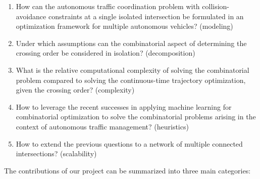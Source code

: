 \documentclass[a4paper]{report}
\theoremstyle{definition}
\theoremstyle{plain}
\begin{document}
\begin{enumerate}[label=RQ\arabic*:, leftmargin=3em, rightmargin=4em]
  \item How can the autonomous traffic coordination problem with
        collision-avoidance constraints at a single isolated intersection be
        formulated in an optimization framework for multiple autonomous
        vehicles? (modeling)

  \item Under which assumptions can the combinatorial aspect of determining the
        crossing order be considered in isolation? (decomposition)

  \item What is the relative computational complexity of solving the
        combinatorial problem compared to solving the continuous-time trajectory
        optimization, given the crossing order? (complexity)

  \item How to leverage the recent successes in applying machine learning for
        combinatorial optimization to solve the combinatorial problems arising
        in the context of autonomous traffic management? (heuristics)

  \item How to extend the previous questions to a network of multiple connected
        intersections? (scalability)
\end{enumerate}



\noindent
The contributions of our project can be summarized into three main categories:
\end{document}
